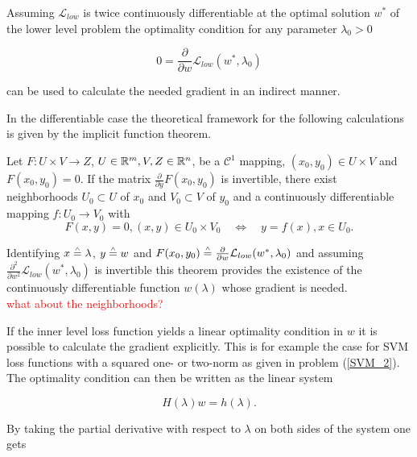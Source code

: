 Assuming \(\mathcal{L}_{low}\) is twice continuously differentiable at the  optimal solution \(w^*\) of the lower level problem the optimality condition for any parameter \(\lambda_0 > 0\)

\begin{equation}
	0 = \frac{\partial}{\partial w}\mathcal{L}_{low}(w^*,\lambda_0)
\label{opt_con}
\end{equation}


can be used to calculate the needed gradient in an indirect manner.

In the differentiable case the theoretical framework for the following calculations is given by the implicit function theorem.

\begin{theorem}
	Let \(F: U \times V \to Z \), \(U\in\mathbb{R}^m, V,Z\in \mathbb{R}^n \), be a \(\mathcal{C}^1\) mapping, \((x_0,y_0) \in U\times V\)  and \(F(x_0,y_0) = 0\). If the matrix \(\frac{\partial}{\partial y}F(x_0,y_0)\) is invertible, there exist neighborhoods \(U_0\subset U\) of \(x_0\) and \(V_0\subset V\) of \(y_0\) and a continuously differentiable mapping \(f:U_0 \to V_0\) with 
	\begin{equation*}
	F(x,y) = 0, (x,y)\in U_0\times V_0  \quad \Leftrightarrow \quad y = f(x), x\in U_0.
	\end{equation*}
\end{theorem}

Identifying \(x \overset{\scriptscriptstyle\wedge}{=} \lambda\), \(y \overset{\scriptscriptstyle\wedge}{=} w\) and  \(F(x_0,y_0) \overset{\scriptscriptstyle\wedge}{=} \frac{\partial}{\partial w} \mathcal{L}_{low}(w^*,\lambda_0)\) and assuming \(\frac{\partial^2 }{\partial  w^2}\mathcal{L}_{low}(w^*,\lambda_0)\) is invertible this theorem provides the existence of the continuously differentiable function \(w(\lambda)\) whose gradient is needed. \\
\textcolor{red}{what about the neighborhoods?}

If the inner level loss function yields a linear optimality condition in \(w\) it is possible to calculate the gradient explicitly. This is for example the case for SVM loss functions with a squared one- or two-norm as given in problem (\ref{SVM_2}).
The optimality condition can then be written as the linear system

\begin{equation*}
	H(\lambda)w = h(\lambda).
\end{equation*}

By taking the partial derivative with respect to \(\lambda\) on both sides of the system one gets

